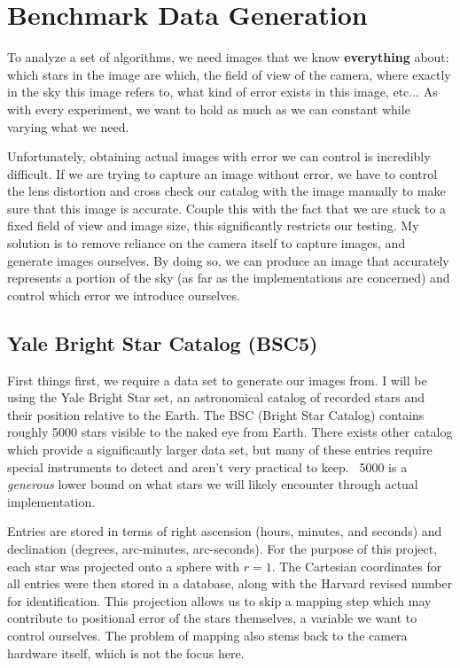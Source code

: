 \section{Benchmark Data Generation}
To analyze a set of algorithms, we need images that we know \textbf{everything} about: which stars in the image are which, the field of view of the camera, where exactly in the sky this image refers to, what kind of error exists in this image, etc... As with every experiment, we want to hold as much as we can constant while varying what we need. \smallskip

Unfortunately, obtaining actual images with error we can control is incredibly difficult. If we are trying to capture an image without error, we have to control the lens distortion and cross check our catalog with the image manually to make sure that this image is accurate. Couple this with the fact that we are stuck to a fixed field of view and image size, this significantly restricts our testing. My solution is to remove reliance on the camera itself to capture images, and generate images ourselves. By doing so, we can produce an image that accurately represents a portion of the sky (as far as the implementations are concerned) and control which error we introduce ourselves. \smallskip

\subsection{Yale Bright Star Catalog (BSC5)}
First things first, we require a data set to generate our images from. I will be using the Yale Bright Star set, an astronomical catalog of recorded stars and their position relative to the Earth. The BSC (Bright Star Catalog) contains roughly 5000 stars visible to the naked eye from Earth. There exists other catalog which provide a significantly larger data set, but many of these entries require special instruments to detect and aren't very practical to keep. ~5000 is a \textit{generous} lower bound on what stars we will likely encounter through actual implementation. \smallskip

Entries are stored in terms of right ascension (hours, minutes, and seconds) and declination (degrees, arc-minutes, arc-seconds). For the purpose of this project, each star was projected onto a sphere with $r=1$. The Cartesian coordinates for all entries were then stored in a database, along with the Harvard revised number for identification. This projection allows us to skip a mapping step which may contribute to positional error of the stars themselves, a variable we want to control ourselves. The problem of mapping also stems back to the camera hardware itself, which is not the focus here. \smallskip

